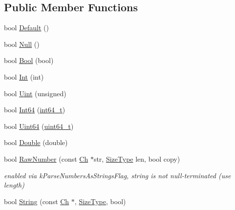\subsection*{Public Member Functions}
\begin{DoxyCompactItemize}
\item 
bool \mbox{\hyperlink{structrapidjson_1_1_base_reader_handler_a050d1b4130a924d138f762d3c914a748}{Default}} ()
\item 
bool \mbox{\hyperlink{structrapidjson_1_1_base_reader_handler_a823c816871a8dd881019ee8526b517cb}{Null}} ()
\item 
bool \mbox{\hyperlink{structrapidjson_1_1_base_reader_handler_aead125c32fbf2a1311a2ba9c95b8604a}{Bool}} (bool)
\item 
bool \mbox{\hyperlink{structrapidjson_1_1_base_reader_handler_a7de3a16b56209aa2aa56a42591c426cb}{Int}} (int)
\item 
bool \mbox{\hyperlink{structrapidjson_1_1_base_reader_handler_a9627844582969a7d79a2250bdb4f9ec0}{Uint}} (unsigned)
\item 
bool \mbox{\hyperlink{structrapidjson_1_1_base_reader_handler_afb78023dc0f5a31f9c5d5de4a55d9077}{Int64}} (\mbox{\hyperlink{stdint_8h_a414156feea104f8f75b4ed9e3121b2f6}{int64\+\_\+t}})
\item 
bool \mbox{\hyperlink{structrapidjson_1_1_base_reader_handler_a76b043fefd5fac0faadf3846995af6f5}{Uint64}} (\mbox{\hyperlink{stdint_8h_aec6fcb673ff035718c238c8c9d544c47}{uint64\+\_\+t}})
\item 
bool \mbox{\hyperlink{structrapidjson_1_1_base_reader_handler_a03e7d273b4d317b61a4ae56e0da9097a}{Double}} (double)
\item 
bool \mbox{\hyperlink{structrapidjson_1_1_base_reader_handler_a0de969fd05528960c2a7de51b2265bf1}{Raw\+Number}} (const \mbox{\hyperlink{structrapidjson_1_1_base_reader_handler_a2932a8ecbb1997dda305f4dbef32ab0d}{Ch}} $\ast$str, \mbox{\hyperlink{namespacerapidjson_a44eb33eaa523e36d466b1ced64b85c84}{Size\+Type}} len, bool copy)
\begin{DoxyCompactList}\small\item\em enabled via k\+Parse\+Numbers\+As\+Strings\+Flag, string is not null-\/terminated (use length) \end{DoxyCompactList}\item 
bool \mbox{\hyperlink{structrapidjson_1_1_base_reader_handler_ad48b724f01c31c1fdbd623bd31df6a3c}{String}} (const \mbox{\hyperlink{structrapidjson_1_1_base_reader_handler_a2932a8ecbb1997dda305f4dbef32ab0d}{Ch}} $\ast$, \mbox{\hyperlink{namespacerapidjson_a44eb33eaa523e36d466b1ced64b85c84}{Size\+Type}}, bool)

\end{DoxyCompactItemize}
